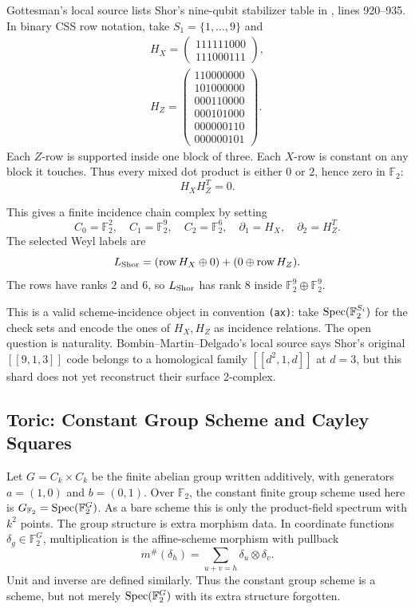 Gottesman's local source lists Shor's nine-qubit stabilizer table in
, lines
920--935.  In binary CSS row notation, take \(S_1=\{1,\ldots,9\}\) and
\[
\begin{gathered}
H_X=\begin{pmatrix}111111000\\111000111\end{pmatrix},\\
H_Z=\begin{pmatrix}
110000000\\101000000\\000110000\\000101000\\000000110\\000000101
\end{pmatrix}.
\end{gathered}
\]
Each \(Z\)-row is supported inside one block of three.  Each \(X\)-row is
constant on any block it touches.  Thus every mixed dot product is either \(0\)
or \(2\), hence zero in \(\mathbb F_2\):
\[
  H_XH_Z^T=0.
\]

This gives a finite incidence chain complex by setting
\[
  C_0=\mathbb F_2^2,\quad C_1=\mathbb F_2^9,\quad C_2=\mathbb F_2^6,
  \quad \partial_1=H_X,\quad \partial_2=H_Z^T .
\]
The selected Weyl labels are
\[
  L_{\rm Shor}
  =
  (\operatorname{row}H_X\oplus0)+(0\oplus\operatorname{row}H_Z).
\]
The rows have ranks \(2\) and \(6\), so \(L_{\rm Shor}\) has rank \(8\) inside
\(\mathbb F_2^9\oplus\mathbb F_2^9\).

This is a valid scheme-incidence object in convention \texttt{(ax)}: take
\(\operatorname{Spec}(\mathbb F_2^{S_i})\) for the check sets and encode the ones of
\(H_X,H_Z\) as incidence relations.  The open question is naturality.
Bombin--Martin--Delgado's local source says Shor's original \([[9,1,3]]\) code
belongs to a homological family \([[d^2,1,d]]\) at \(d=3\), but this shard does
not yet reconstruct their surface 2-complex.

\subsection{Toric: Constant Group Scheme and Cayley Squares}

Let \(G=C_k\times C_k\) be the finite abelian group written additively, with
generators \(a=(1,0)\) and \(b=(0,1)\).  Over \(\mathbb F_2\), the constant
finite group scheme used here is \(G_{\mathbb F_2}=\operatorname{Spec}(\mathbb F_2^G)\).  As
a bare scheme this is only the product-field spectrum with \(k^2\) points.  The
group structure is extra morphism data.  In coordinate functions
\(\delta_g\in\mathbb F_2^G\), multiplication is the affine-scheme morphism with
pullback
\[
  m^\#(\delta_h)=\sum_{u+v=h}\delta_u\otimes\delta_v .
\]
Unit and inverse are defined similarly.  Thus the constant group scheme is a
scheme, but not merely \(\operatorname{Spec}(\mathbb F_2^G)\) with its extra structure
forgotten.

